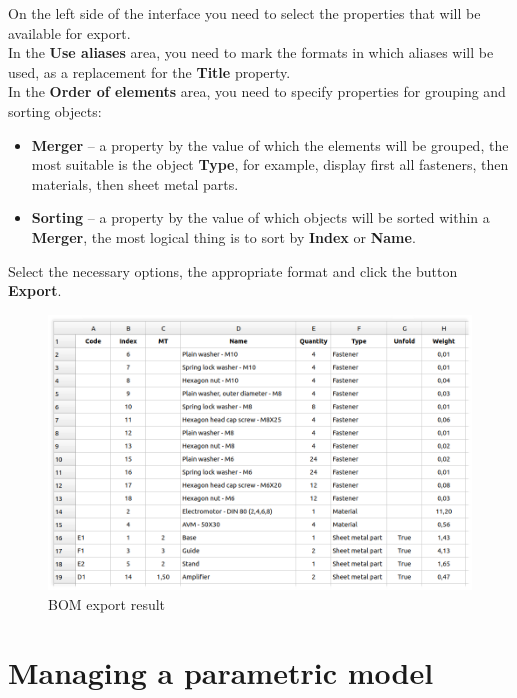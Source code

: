 \documentclass[a4paper,12pt]{article}
\begin{document}
On the left side of the interface you need to select the properties that will be available for export.\\

In the \textbf{Use aliases} area, you need to mark the formats in which aliases will be used, as a replacement for the \textbf{Title} property.\\

In the \textbf{Order of elements} area, you need to specify properties for grouping and sorting objects:
\begin{itemize}
	\item \textbf{Merger} -- a property by the value of which the elements will be grouped, the most suitable is the object \textbf{Type}, for example, display first all fasteners, then materials, then sheet metal parts.
	\item \textbf{Sorting} -- a property by the value of which objects will be sorted within a \textbf{Merger}, the most logical thing is to sort by \textbf{Index} or \textbf{Name}.
\end{itemize}

\pagebreak

Select the necessary options, the appropriate format and click the button \textbf{Export}.

\begin{figure}[htp]
	\centering
	\includegraphics[width=1\textwidth]{img/specification_result.png}
	\caption{BOM export result}
	\label{sec:specification_result}
\end{figure}

\pagebreak




\section{Managing a parametric model}
\end{document}
